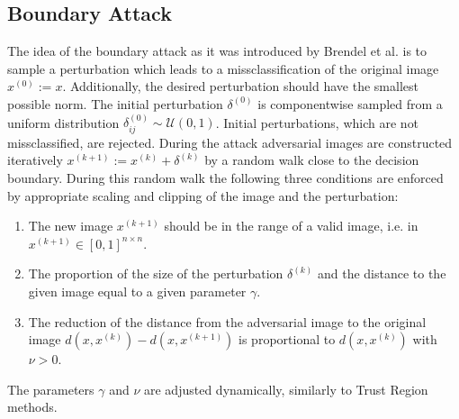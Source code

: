 \documentclass{article}
\begin{document}
\subsection{Boundary Attack}

The idea of the boundary attack as it was introduced by Brendel et al.  is to sample a perturbation which leads to a missclassification of the original image $x^{(0)}:=x$. Additionally, the desired perturbation should have the smallest possible norm. The initial perturbation $\delta^{(0)}$ is componentwise sampled from a uniform distribution $\delta^{(0)}_{ij}\sim \mathcal{U}(0,1)$. Initial perturbations, which are not missclassified, are rejected. During the attack adversarial images are constructed iteratively $x^{(k+1)}:= x^{(k)}+\delta^{(k)}$ by a random walk close to the decision boundary. During this random walk the following three conditions are enforced by appropriate scaling and clipping of the image and the perturbation:
\begin{enumerate}
	\item The new image $x^{(k+1)}$ should be in the range of a valid image, i.e. in $x^{(k+1)}\in [0,1]^{n\times n}$.
	\item The proportion of the size of the perturbation $\delta^{(k)}$ and the distance to the given image equal to a given parameter $\gamma$.
	\item The reduction of the distance from the adversarial image to the original image $d(x, x^{(k)})-d(x, x^{(k+1)})$ is proportional to $d(x, x^{(k)})$ with $\nu>0$.
\end{enumerate}
The parameters $\gamma$ and $\nu$ are adjusted dynamically, similarly to Trust Region methods.
\end{document}
